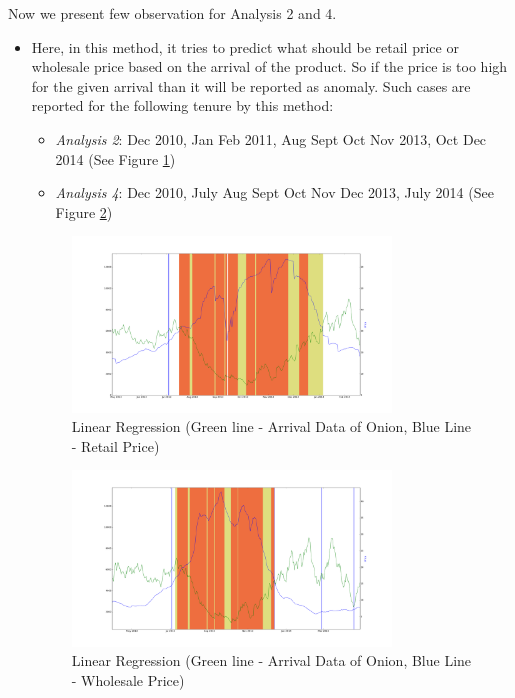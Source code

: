 \documentclass[a4paper,10pt]{report}
\begin{document}
		
		Now we present few observation for Analysis 2 and 4.
		
		
		\begin{itemize}
			\item Here, in this method, it tries to predict what should be retail price or wholesale price based on the arrival of the product. So if the price is too high for the given arrival than it will be reported as anomaly.
			Such cases are reported for the following tenure by this method:
			\begin{itemize}
				\item \textit{Analysis 2}: Dec 2010, Jan Feb 2011, Aug Sept Oct Nov 2013, Oct Dec 2014 (See Figure \ref{fig:12221})
				\item \textit{Analysis 4}: Dec 2010, July Aug Sept Oct Nov Dec 2013, July 2014 (See Figure \ref{fig:12241})
			\end{itemize}
			\begin{figure}[H]
		    	\centering
  		    	\includegraphics[width=0.8\textwidth]{graphs/12221.png}
		    	\caption{Linear Regression (Green line - Arrival Data of Onion, Blue Line - Retail Price)}
		    	\label{fig:12221}
			\end{figure}
			
			\begin{figure}[H]
		    	\centering
  		    	\includegraphics[width=0.8\textwidth]{graphs/12241.png}
		    	\caption{Linear Regression (Green line - Arrival Data of Onion, Blue Line - Wholesale Price)}
		    	\label{fig:12241}
			\end{figure}
			

\end{itemize}
\end{document}
